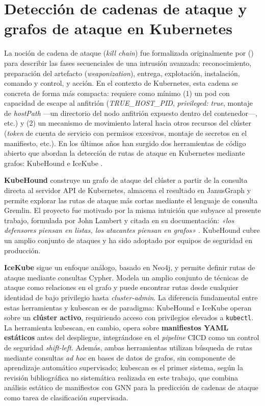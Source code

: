 \section{Detección de cadenas de ataque y grafos de ataque en Kubernetes}

La noción de cadena de ataque (\textit{kill chain}) fue formalizada originalmente
por \citeauthor{Hutchins2011} (\citeyear{Hutchins2011}) para describir las fases
secuenciales de una intrusión avanzada: reconocimiento, preparación del artefacto
(\textit{weaponization}), entrega, explotación, instalación, comando y control, y
acción. En el contexto de Kubernetes, esta cadena se concreta de forma más
compacta: requiere como mínimo (1) un pod con capacidad de escape al anfitrión
(\textit{TRUE\_HOST\_PID}, \textit{privileged: true}, montaje de \textit{hostPath}
—un directorio del nodo anfitrión expuesto dentro del contenedor\mbox{—,} etc.) y (2) un
mecanismo de movimiento lateral hacia otros recursos del clúster (\textit{token} de cuenta
de servicio con permisos excesivos, montaje de secretos en el manifiesto, etc.).
En los últimos años han surgido dos herramientas de código abierto que abordan la
detección de rutas de ataque en Kubernetes mediante grafos:
KubeHound \citep{KubeHound2023} e IceKube \citep{IceKube2023}.

\textbf{KubeHound} \citep{KubeHound2023} construye un grafo de ataque del clúster a partir
de la consulta directa al servidor \ac{API} de Kubernetes, almacena el resultado
en JanusGraph y permite explorar las rutas de ataque más cortas mediante el lenguaje
de consulta Gremlin. El proyecto fue motivado por la misma intuición que subyace al
presente trabajo, formulada por John Lambert y citada en su documentación:
\textit{«los defensores piensan en listas, los atacantes piensan en grafos»}
\citep{KubeHound2023}. KubeHound cubre un
amplio conjunto de ataques y ha sido adoptado por equipos de seguridad en producción.

\textbf{IceKube} \citep{IceKube2023} sigue un enfoque análogo, basado
en Neo4j, y permite definir rutas de ataque mediante consultas Cypher. Modela un
amplio conjunto de técnicas de ataque como relaciones en el grafo y puede encontrar
rutas desde cualquier identidad de bajo privilegio hasta \textit{cluster-admin}.
La diferencia fundamental entre estas herramientas y kubescan es de
paradigma: KubeHound e IceKube operan sobre un \textbf{clúster activo}, requiriendo
acceso con privilegios elevados a \texttt{kubectl}. La herramienta kubescan, en cambio,
opera sobre \textbf{manifiestos \acs{YAML} estáticos} antes del despliegue, integrándose
en el \textit{pipeline} \acs{CICD} como un control de seguridad \textit{shift-left}. Además, ambas
herramientas utilizan búsqueda de rutas mediante consultas \textit{ad hoc} en bases de datos
de grafos, sin componente de aprendizaje automático supervisado; kubescan
es el primer sistema, según la revisión bibliográfica no sistemática realizada en
este trabajo, que combina análisis estático
de manifiestos con \acs{GNN} para la predicción de cadenas de ataque como tarea de
clasificación supervisada.

